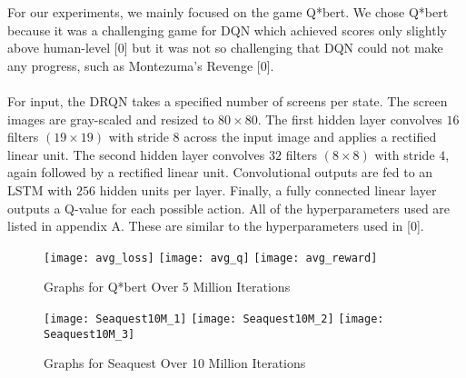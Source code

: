\documentclass{article}
\begin{document}
For our experiments, we mainly focused on the game Q*bert. We chose Q*bert because
it was a challenging game for DQN which achieved scores only slightly above
human-level [0] but it was not so challenging that DQN could not make any progress,
such as Montezuma's Revenge [0]. \\
\\
For input, the DRQN takes a specified number of screens per state. The screen images
are gray-scaled and resized to $80 \times 80$. The first hidden layer convolves $16$
filters $(19 \times 19)$ with stride $8$ across the input image and applies a rectified
linear unit.  The second hidden layer convolves $32$ filters  $(8 \times 8)$ with
stride $4$, again followed by a rectified linear unit.  Convolutional outputs are
fed to an LSTM with $256$ hidden units per layer.  Finally, a fully connected
linear layer outputs a Q-value for each possible action. All of the hyperparameters
used are listed in appendix A. These are similar to the hyperparameters used in [0]. \\

\begin{figure}[h]
    \centering
    \begin{minipage}{1.0\textwidth}
        \centering
        \texttt{[image: avg\_loss]}
        \centering
        \texttt{[image: avg\_q]}
        \centering
        \texttt{[image: avg\_reward]}
    \end{minipage}
    \caption{Graphs for Q*bert Over 5 Million Iterations}
\end{figure}

\begin{figure}[h]
    \centering
    \begin{minipage}{1.0\textwidth}
        \centering
        \texttt{[image: Seaquest10M\_1]}
        \centering
        \texttt{[image: Seaquest10M\_2]}
        \centering
        \texttt{[image: Seaquest10M\_3]}
    \end{minipage}
    \caption{Graphs for Seaquest Over 10 Million Iterations}
\end{figure}
\end{document}
